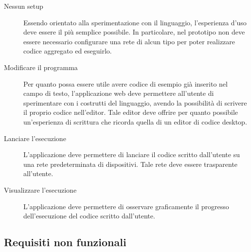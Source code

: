       \begin{description}
        \item[Nessun setup]
          Essendo orientato alla sperimentazione con il linguaggio, l'esperienza d'uso deve essere il più semplice possibile.
          In particolare, nel prototipo non deve essere necessario configurare una rete di alcun tipo per poter realizzare codice aggregato ed eseguirlo.
        \item[Modificare il programma]
          Per quanto possa essere utile avere codice di esempio già inserito nel campo di testo, l'applicazione web deve permettere all'utente di sperimentare con i costrutti del linguaggio, avendo la possibilità di scrivere il proprio codice nell'editor.
          Tale editor deve offrire per quanto possibile un'esperienza di scrittura che ricorda quella di un editor di codice desktop.
        \item[Lanciare l'esecuzione]
          L'applicazione deve permettere di lanciare il codice scritto dall'utente su una rete predeterminata di dispositivi.
          Tale rete deve essere trasparente all'utente.
        \item[Visualizzare l'esecuzione]
          L'applicazione deve permettere di osservare graficamente il progresso dell'esecuzione del codice scritto dall'utente.
      \end{description}

    \subsection{Requisiti non funzionali}

